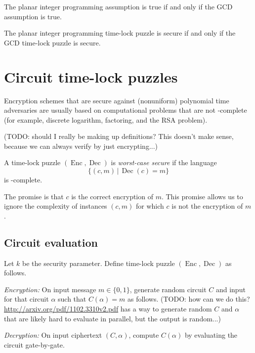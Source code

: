 \documentclass{article}
\newcommand{\Enc}{\operatorname{Enc}}
\newcommand{\Dec}{\operatorname{Dec}}
\newcommand{\Piy}{\Pi_{yes}}
\newcommand{\Pin}{\Pi_{no}}
\begin{document}
\begin{conjecture}
  The planar integer programming assumption is true if and only if the GCD assumption is true.
\end{conjecture}

\begin{conjecture}
  The planar integer programming time-lock puzzle is secure if and only if the GCD time-lock puzzle is secure.
\end{conjecture}

\section{Circuit time-lock puzzles}

Encryption schemes that are secure against (nonuniform) polynomial time adversaries are usually based on computational problems that are not \NP-complete (for example, discrete logarithm, factoring, and the RSA problem).

\begin{definition}
  (TODO: should I really be making up definitions? This doesn't make sense, because we can always verify by just encrypting...)


  A time-lock puzzle $(\Enc, \Dec)$ is \emph{worst-case secure} if the language
  $$
  \{ (c, m) \, | \, \Dec(c) = m \}
  $$
  is \prP-complete.
\end{definition}
The promise is that $c$ is the correct encryption of $m$.
This promise allows us to ignore the complexity of instances $(c, m)$ for which $c$ is not the encryption of $m$.

\subsection{Circuit evaluation}

\begin{protocol}
  Let $k$ be the security parameter.
  Define time-lock puzzle $(\Enc, \Dec)$ as follows.

  \emph{Encryption:} On input message $m \in \{0, 1\}$, generate random circuit $C$ and input for that circuit $\alpha$ such that $C(\alpha) = m$ as follows.
  (TODO: how can we do this? \url{http://arxiv.org/pdf/1102.3310v2.pdf} has a way to generate random $C$ and $\alpha$ that are likely hard to evaluate in parallel, but the output is random...)

  \emph{Decryption:} On input ciphertext $(C, \alpha)$, compute $C(\alpha)$ by evaluating the circuit gate-by-gate.
\end{protocol}
\end{document}
